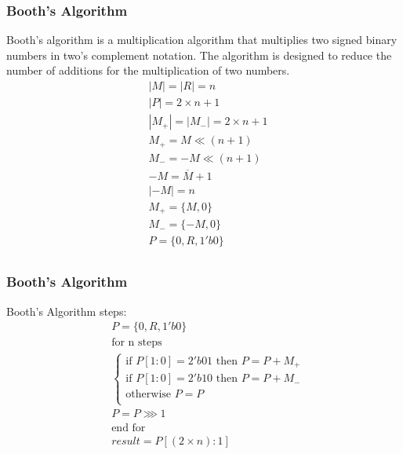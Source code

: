 \begin{frame}
    \frametitle{Booth's Algorithm}
    Booth's algorithm is a multiplication algorithm that multiplies two signed binary numbers in two's complement notation. The algorithm is designed to reduce the number of additions for the multiplication of two numbers.
    \begin{equation}
        \begin{aligned}
            &|M|=|R|=n\\
            &|P|=2 \times n + 1\\
            &|M_{+}|=|M_{-}|=2 \times n+1\\
            &M_{+}=M \ll (n + 1)\\
            &M_{-}=-M \ll (n + 1)\\
            &-M=\overline{M}+1\\
            &|-M|=n\\
            &M_{+}=\{M, 0\}\\
            &M_{-}=\{-M, 0\}\\
            &P=\{0,R,1'b0\}\\
        \end{aligned}
    \end{equation}
\end{frame}

\begin{frame}
    \frametitle{Booth's Algorithm}
    Booth's Algorithm steps:
    \begin{equation}
        \begin{aligned}
            &P=\{0,R,1'b0\}\\
            &\text{for n steps}\\
            &\begin{cases}
                \text{if } P[1:0]=2'b01 \text{ then } P=P+M_{+}\\
                \text{if } P[1:0]=2'b10 \text{ then } P=P+M_{-}\\
                \text{otherwise } P=P\\
            \end{cases}\\
            &P=P \ggg 1\\
            &\text{end for}\\
            &result=P[(2 \times n):1]
        \end{aligned}
    \end{equation}
\end{frame}

